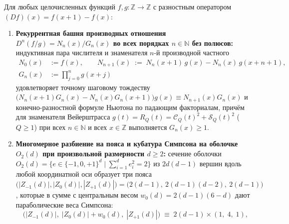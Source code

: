 \begin{theorem}[Башня разностных производных частного $D^n(f/g) = N_n/G_n$ всех порядков $n\in\mathbb{N}$, вариационный принцип, многомерная кубатура Симпсона на $O_2(d)$ и конструктивные когомологии де~Рама]
\label{thm:math-c-infinity-simpson-derham}
\leanok
Для любых целочисленных функций $f, g : \mathbb{Z} \to \mathbb{Z}$ с разностным оператором $(Df)(x) = f(x+1) - f(x)$:
\begin{enumerate}[label=\textbf{(\arabic*)},leftmargin=*]
\item \textbf{Рекуррентная башня производных отношения $D^n(f/g) = N_n(x)/G_n(x)$ во всех порядках $n\in\mathbb{N}$ без полюсов:}
  индуктивная пара числителя и знаменателя $n$-й производной частного
  \begin{align}
    N_0(x) &:= f(x), \qquad
    N_{n+1}(x) \;:=\; N_n(x+1)\,g(x) - N_n(x)\,g(x+n+1), \label{eq:math-quot-numer-tower} \\
    G_n(x) &:= \prod_{j=0}^n g(x+j) \label{eq:math-quot-denom-tower}
  \end{align}
  удовлетворяет точному шаговому тождеству $\bigl(N_n(x+1)G_n(x) - N_n(x)G_n(x+1)\bigr)g(x) \equiv N_{n+1}(x)G_n(x)$ и конечно-разностной формуле Ньютона по падающим факториалам, причём для знаменателя Вейерштрасса $g(t) = R_Q(t) = \mathcal{C}_Q(t)^2 + \mathcal{S}_Q(t)^2$ ($Q \ge 1$) при всех $n\in\mathbb{N}$ и всех $x\in\mathbb{Z}$ выполняется $G_n(x) \ge 1$.
\item \textbf{Многомерное разбиение на пояса и кубатура Симпсона на оболочке $O_2(d)$ при произвольной размерности $d \ge 2$:}
  сечение оболочки $O_2(d) = \{e \in \{-1,0,+1\}^d \mid \sum_{i=1}^d e_i^2 = 2\}$ из $2d(d-1)$ вершин вдоль любой координатной оси образует три пояса $\bigl(|Z_{-1}(d)|, |Z_0(d)|, |Z_{+1}(d)|\bigr) = \bigl(2(d-1),\ 2(d-1)(d-2),\ 2(d-1)\bigr)$, которые в сумме с центральным весом $w_0(d) = 2(d-1)(6-d)$ дают параболические веса Симпсона:
  \begin{equation}
    \label{eq:math-simpson-weights-d}
    \bigl(|Z_{-1}(d)|,\; |Z_0(d)| + w_0(d),\; |Z_{+1}(d)|\bigr) \;\equiv\; 2(d-1)\times(1,\; 4,\; 1),
  \end{equation}

\end{enumerate}
\end{theorem}
